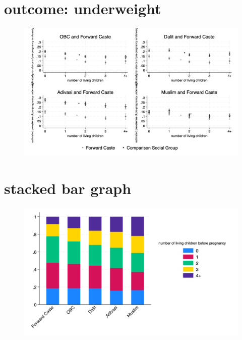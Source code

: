 \documentclass{article}
\begin{document}
\section{outcome: underweight}
\begin{figure}[H]
    \centering
    \includegraphics[width=\textwidth]{figures/prepreg_underweight_combined.png}
\end{figure}

\section{stacked bar graph}
\begin{figure}[H]
    \centering
    \includegraphics[width=\textwidth]{figures/stackedbar_parity_socialgroup.png}
\end{figure}
\end{document}
